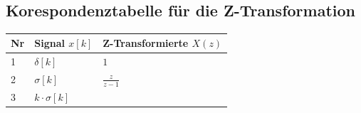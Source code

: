 \documentclass[11pt]{article}
\begin{document}
    \begin{center}
    \end{center}
    { \hspace*{\fill} \\}
    
    \subsection{Korespondenztabelle für die
Z-Transformation}\label{korespondenztabelle-fuxfcr-die-z-transformation}

\begin{longtable}[]{@{}lll@{}}
\toprule
\begin{minipage}[b]{0.05\columnwidth}\raggedright\strut
Nr\strut
\end{minipage} & \begin{minipage}[b]{0.28\columnwidth}\raggedright\strut
Signal \(x[k]\)\strut
\end{minipage} & \begin{minipage}[b]{0.58\columnwidth}\raggedright\strut
Z-Transformierte \(X(z)\)\strut
\end{minipage}\tabularnewline
\midrule
\endhead
\begin{minipage}[t]{0.05\columnwidth}\raggedright\strut
1\strut
\end{minipage} & \begin{minipage}[t]{0.28\columnwidth}\raggedright\strut
\(\delta[k]\)\strut
\end{minipage} & \begin{minipage}[t]{0.58\columnwidth}\raggedright\strut
\(1\)\strut
\end{minipage}\tabularnewline
\begin{minipage}[t]{0.05\columnwidth}\raggedright\strut
2\strut
\end{minipage} & \begin{minipage}[t]{0.28\columnwidth}\raggedright\strut
\(\sigma[k]\)\strut
\end{minipage} & \begin{minipage}[t]{0.58\columnwidth}\raggedright\strut
\(\frac{z}{z-1}\)\strut
\end{minipage}\tabularnewline
\begin{minipage}[t]{0.05\columnwidth}\raggedright\strut
3\strut
\end{minipage} & \begin{minipage}[t]{0.28\columnwidth}\raggedright\strut
\(k \cdot \sigma[k]\)\strut

\end{minipage}
\end{longtable}
\end{document}
